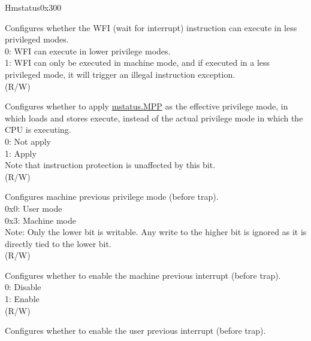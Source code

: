 \begin{register}{H}{mstatus}{0x300}\label{regdesc:MSTATUS}
%
%
%
%
%
%
%
%
%
%
%
%
%
\regnewline%
\begin{regdesc}\begin{reglist}
\label{fielddesc:MSTATUSTW}\item [TW] Configures whether the WFI (wait for interrupt) instruction can execute in less privileged modes. \\
0: WFI can execute in lower privilege modes.\\
1: WFI can only be executed in machine mode, and if executed in a less privileged mode, it will trigger an illegal instruction exception.\\
(R/W)
\label{fielddesc:MSTATUS_MPRV}\item [MPRV] Configures whether to apply \hyperref[fielddesc:MSTATUSMPP]{mstatus.MPP} as the effective privilege mode, in which loads and stores execute, instead of the actual privilege mode in which the CPU is executing. \\
0: Not apply\\
1: Apply\\
Note that instruction protection is unaffected by this bit.\\
(R/W)
\label{fielddesc:MSTATUSMPP}\item [MPP] Configures machine previous privilege mode (before trap).\\
0x0: User mode\\
0x3: Machine mode\\
Note: Only the lower bit is writable. Any write to the higher bit is ignored as it is directly tied to the lower bit.\\
(R/W)
\label{fielddesc:MSTATUSMPIE}\item [MPIE] Configures whether to enable the machine previous interrupt (before trap). \\
0: Disable\\
1: Enable\\
(R/W)
\label{fielddesc:MSTATUSUPIE}\item [UPIE] Configures whether to enable the user previous interrupt (before trap). \\

\end{reglist}
\end{regdesc}
\end{register}
